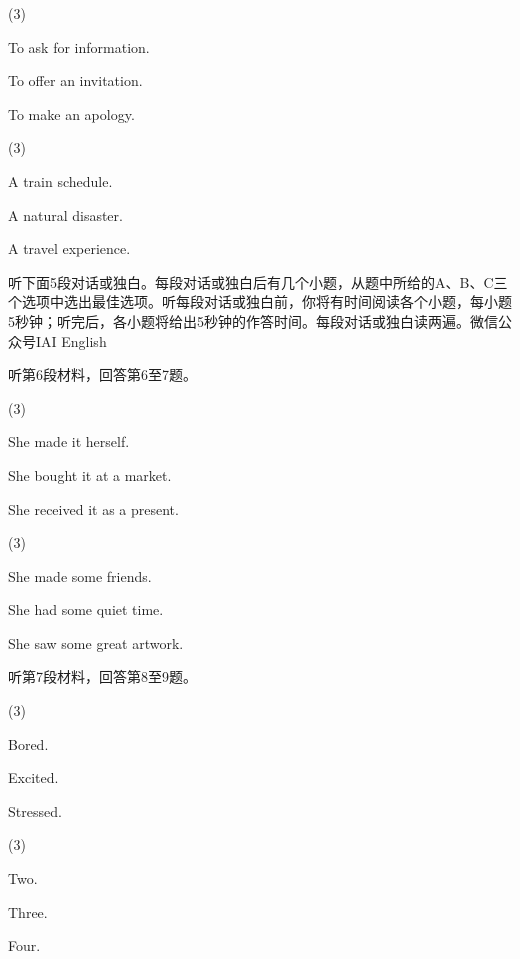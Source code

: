 \documentclass{英语试卷}
\begin{document}
\begin{choices}(3)
  \item To ask for information.
  \item To offer an invitation.
  \item To make an apology.
\end{choices}
\begin{choices}(3)
  \item A train schedule.
  \item A natural disaster.
  \item A travel experience.
\end{choices}
\par 听下面5段对话或独白。每段对话或独白后有几个小题，从题中所给的A、B、C三个选项中选出最佳选项。听每段对话或独白前，你将有时间阅读各个小题，每小题5秒钟；听完后，各小题将给出5秒钟的作答时间。每段对话或独白读两遍。微信公众号IAI English\par
\par 听第6段材料，回答第6至7题。\par
{}
\begin{choices}(3)
  \item She made it herself.
  \item She bought it at a market.
  \item She received it as a present.
\end{choices}
\begin{choices}(3)
  \item She made some friends.
  \item She had some quiet time.
  \item She saw some great artwork.
\end{choices}
\par 听第7段材料，回答第8至9题。\par
{}
\begin{choices}(3)
  \item Bored.
  \item Excited.
  \item Stressed.
\end{choices}
\begin{choices}(3)
  \item Two.
  \item Three.
  \item Four.
\end{choices}
\end{document}

